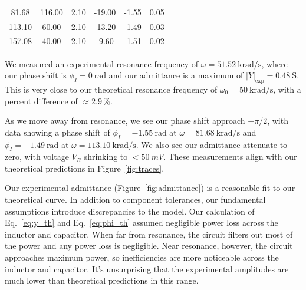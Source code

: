 \documentclass[11pt,twocolumn]{article}
\begin{document}
\begin{table}[H]
{\begin{tabular}{
        S[table-format=3.2]
        S[table-format=3.2]
        S[table-format=1.2]
        S[table-format=-2.2]
        S[table-format=-1.2]
        S[table-format=1.2]
      }
      81.68                                       & 116.00              & 2.10               & -19.00                              & -1.55                                      & 0.05                                     \\
      113.10                                      & 60.00               & 2.10               & -13.20                              & -1.49                                      & 0.03                                     \\
      157.08                                      & 40.00               & 2.10               & -9.60                               & -1.51                                      & 0.02                                     \\
      \bottomrule
    \end{tabular}%
  }
\end{table}

We measured an experimental resonance frequency of $\omega = \qty{51.52}{\kilo\radian\per\second}$, where our phase shift is $\phi_I = \qty{0}{\radian}$ and our admittance is a maximum of $|Y|_{\mathrm{exp}} = \qty{0.48}{\siemens}$. This is very close to our theoretical resonance frequency of $\omega_0 = \qty{50}{\kilo\radian\per\second}$, with a percent difference of $\approx 2.9\,\%$.

As we move away from resonance, we see our phase shift approach $\pm\pi/2$, with data showing a phase shift of $\phi_I = \qty{-1.55}{\radian}$ at $\omega = \qty{81.68}{\kilo\radian\per\second}$ and $\phi_I = \qty{-1.49}{\radian}$ at $\omega = \qty{113.10}{\kilo\radian\per\second}$. We also see our admittance attenuate to zero, with voltage $V_R$ shrinking to $< \qty{50}{mV}$. These measurements align with our theoretical predictions in Figure~\ref{fig:traces}.

Our experimental admittance (Figure~\ref{fig:admittance}) is a reasonable fit to our theoretical curve. In addition to component tolerances, our fundamental assumptions introduce discrepancies to the model. Our calculation of Eq.~\eqref{eq:y_th} and Eq.~\eqref{eq:phi_th} assumed negligible power loss across the inductor and capacitor. When far from resonance, the circuit filters out most of the power and any power loss is negligible. Near resonance, however, the circuit approaches maximum power, so inefficiencies are more noticeable across the inductor and capacitor. It's unsurprising that the experimental amplitudes are much lower than theoretical predictions in this range.
\end{document}
